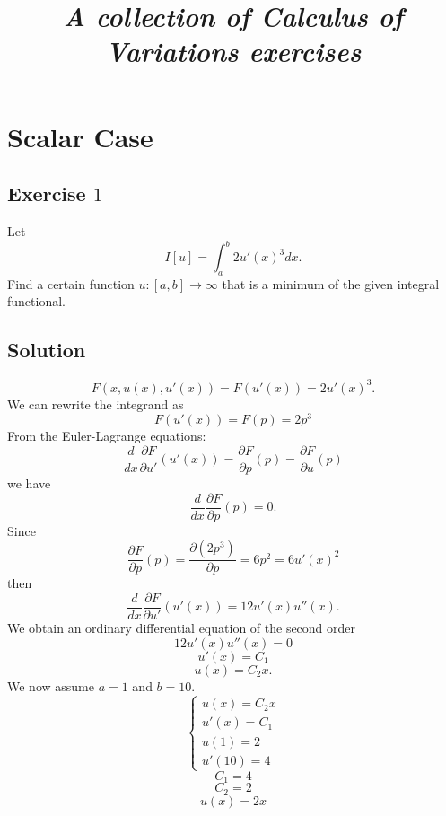 \documentclass[a4paper, twoside, openany]{book}
\title{\textbf{\huge{\textit{A collection of Calculus of Variations exercises}}}}
\begin{document}
\maketitle
\chapter{Scalar Case}
\section*{Exercise $1$}
Let
$$I[u] = \int_a^b 2 u'(x)^3 dx.$$
Find a certain function $u: [a, b] \rightarrow \infty$ that is a minimum of the given integral functional. 
\section*{Solution}
$$F(x, u(x), u'(x)) = F(u'(x)) = 2 u'(x)^3.$$
We can rewrite the integrand as
$$F(u'(x)) = F(p) = 2 p^3$$
From the Euler-Lagrange equations:
$$\frac{d}{dx}\frac{\partial F}{\partial u'} (u'(x)) = \frac{\partial F}{\partial p}(p) = \frac{\partial F}{\partial u}(p)$$
we have
$$\frac{d}{dx}\frac{\partial F}{\partial p} (p) = 0.$$
Since
$$\frac{\partial F}{\partial p} (p) = \frac{\partial (2 p^3)}{\partial p} = 6 p^2 = 6 u'(x)^2$$
then
$$\frac{d}{dx}\frac{\partial F}{\partial u'}(u'(x)) = 12 u'(x) u''(x).$$
We obtain an ordinary differential equation of the second order
$$12 u'(x) u''(x) = 0$$
$$u'(x) = C_1$$
$$u(x) = C_2 x.$$
We now assume $a = 1$ and $b = 10$.
$$\begin{cases}
	u(x) = C_2 x \\
	u'(x) = C_1 \\
	u(1) = 2 \\
	u'(10) = 4
\end{cases}$$
$$C_1 = 4$$
$$C_2 = 2$$
$$u(x) = 2 x$$
\begin{figure}[!ht]
\begin{center}
\end{center}
\end{figure}
\clearpage
\end{document}
